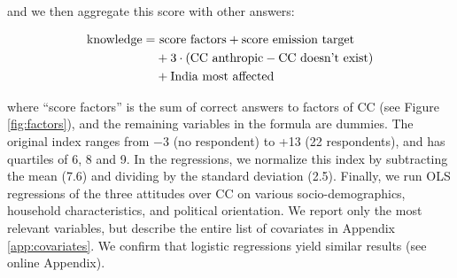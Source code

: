 \documentclass[english,5p,authoryear]{elsarticle}
\begin{document}
\noindent and we then aggregate this score with other answers:

\begin{align}
\textnormal{knowledge}= & \textnormal{ score factors}+\textnormal{score emission target} \nonumber\\
 & +3\cdot\left(\textnormal{CC anthropic}-\textnormal{CC doesn't exist}\right) \nonumber \\
 & +\textnormal{India most affected} \label{eq:knowledge2}
\end{align}

where ``score factors'' is the sum of correct answers to factors of CC (see Figure \ref{fig:factors}), and the remaining variables in the formula are dummies. The original index ranges from $-$3 (no respondent) to +13 (22 respondents), and has quartiles of 6, 8 and 9. In the regressions, we normalize this index by subtracting the mean (7.6) and dividing by the standard deviation (2.5). Finally, we run OLS regressions of the three attitudes over CC on various socio-demographics, household characteristics, and political orientation. We report only the most relevant variables, but describe the entire list of covariates in Appendix \ref{app:covariates}. We confirm that logistic regressions yield similar results (see online Appendix).
\end{document}
